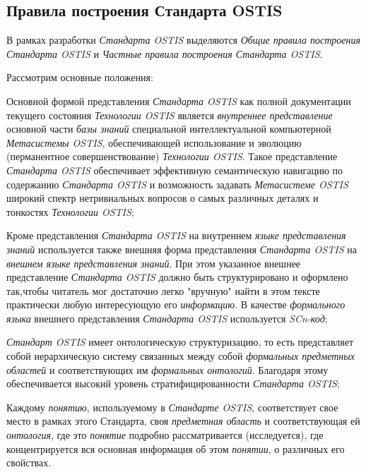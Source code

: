 \subsection{Правила построения Стандарта OSTIS}
\label{standard_rules}

В рамках разработки \textit{Стандарта OSTIS} выделяются \textit{Общие правила построения Стандарта OSTIS} и \textit{Частные правила построения Стандарта OSTIS}.

\begin{SCn}
\end{SCn}

Рассмотрим основные положения:
\begin{textitemize}
	\item Основной формой представления \textit{Стандарта OSTIS} как полной документации текущего состояния \textit{Технологии OSTIS} является \textit{внутреннее представление} основной части \textit{базы знаний} специальной интеллектуальной компьютерной \textit{Метасистемы OSTIS}, обеспечивающей использование и эволюцию (перманентное совершенствование) \textit{Технологии OSTIS}. Такое представление \textit{Стандарта OSTIS} обеспечивает эффективную семантическую навигацию по содержанию \textit{Стандарта OSTIS} и возможность задавать \textit{Метасистеме OSTIS} широкий спектр нетривиальных вопросов о самых различных деталях и тонкостях \textit{Технологии OSTIS};
	\item Кроме представления \textit{Стандарта OSTIS} на внутреннем \textit{языке представления знаний} используется также внешняя форма представления \textit{Стандарта OSTIS} на \textit{внешнем языке представления знаний}. При этом указанное внешнее представление \textit{Стандарта OSTIS} должно быть структурировано и оформлено так,чтобы читатель мог достаточно легко "вручную"{} найти в этом тексте практически любую интересующую его \textit{информацию}. В качестве \textit{формального языка} внешнего представления \textit{Стандарта OSTIS} используется \textit{SCn-код};
	\item \textit{Стандарт OSTIS} имеет онтологическую структуризацию, то есть представляет собой иерархическую систему связанных между собой \textit{формальных предметных областей} и соответствующих им \textit{формальных онтологий}.	Благодаря этому обеспечивается высокий уровень стратифицированности \textit{Стандарта OSTIS};
	\item Каждому \textit{понятию}, используемому в \textit{Стандарте OSTIS}, соответствует свое место в рамках этого Стандарта, своя \textit{предметная область} и соответствующая ей \textit{онтология}, где это \textit{понятие} подробно рассматривается (исследуется), где концентрируется вся основная информация об этом \textit{понятии}, о различных его свойствах.

\end{textitemize}

